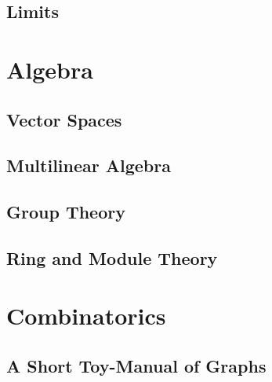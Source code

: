 \chapter{Limits}



\part{Algebra}

\chapter{Vector Spaces}










\chapter{Multilinear Algebra}







\chapter{Group Theory}






\chapter{Ring and Module Theory}





\part{Combinatorics}

\chapter{A Short Toy-Manual of Graphs}

